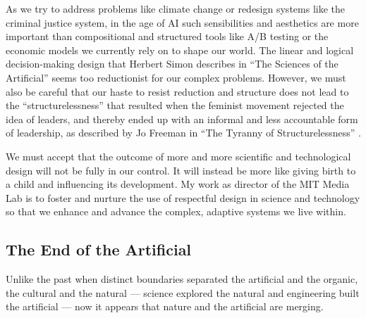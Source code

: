 As we try to address problems like climate change or redesign systems like the criminal justice system, in the age of \ac{AI} such sensibilities and aesthetics are more important than compositional and structured tools like A/B testing or the economic models we currently rely on to shape our world. The linear and logical decision-making design that Herbert Simon describes in ``The Sciences of the Artificial'' \cite{herbert1978science} seems too reductionist for our complex problems. However, we must also be careful that our haste to resist reduction and structure does not lead to the ``structurelessness'' that resulted when the feminist movement rejected the idea of leaders, and thereby ended up with an informal and less accountable form of leadership, as described by Jo Freeman in ``The Tyranny of Structurelessness'' \cite{freeman1972tyranny}.

We must accept that the outcome of more and more scientific and technological design will not be fully in our control. It will instead be more like giving birth to a child and influencing its development. My work as director of the MIT Media Lab is to foster and nurture the use of respectful design in science and technology so that we enhance and advance the complex, adaptive systems we live within. 

\subsection{The End of the Artificial}

Unlike the past when distinct boundaries separated the artificial and the organic, the cultural and the natural --- science explored the natural and engineering built the artificial --- now it appears that nature and the artificial are merging.

